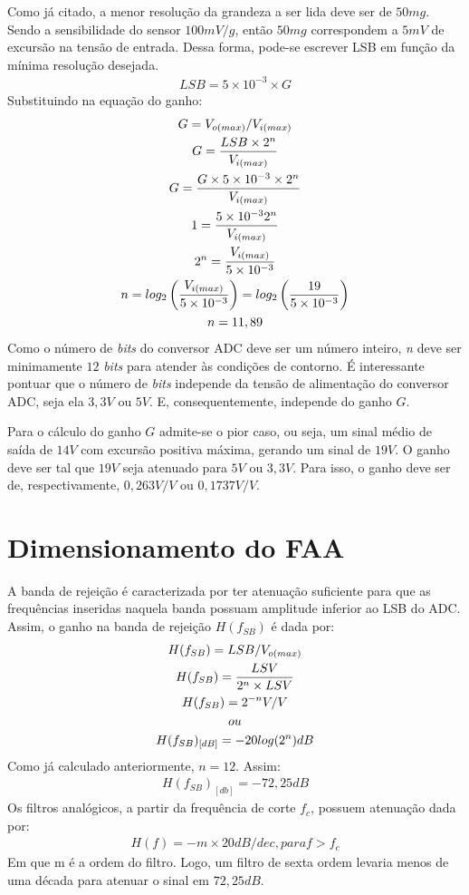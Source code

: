 \documentclass[
	12pt,				%
	openright,			%
	twoside,			%
	a4paper,			%
	english,			%
	french,				%
	spanish,			%
	brazil,				%
	]{abntex2}
\begin{document}
		Como já citado, a menor resolução da grandeza a ser lida deve ser de
		$50mg$. Sendo a sensibilidade do sensor $100mV/g$, então $50mg$
		correspondem a $5mV$ de excursão na tensão de entrada. Dessa forma,
		pode-se escrever LSB em função da mínima resolução desejada.
		\begin{gather*}
			LSB = 5\times 10^{-3}\times G
		\end{gather*}
		Substituindo na equação do ganho:
		\begin{gather*}
			G = V_{o(max)}/V_{i(max)}\\
			G = \frac{LSB\times 2^n}{V_{i(max)}}\\
			G = \frac{G\times 5\times 10^{-3}\times 2^n}{V_{i(max)}}\\
			1 = \frac{5\times 10^{-3}\*2^n}{V_{i(max)}}\\
			2^n = \frac{V_{i(max)}}{5\times 10^{-3}}\\
			n = log_2\left( \frac{V_{i(max)}}{5\times 10^{-3}} \right) = log_2\left( \frac{19}{5\times 10^{-3}}\right)\\
			n = 11,89
		\end{gather*}
		Como o número de \textit{bits} do conversor ADC deve ser um número inteiro, \textit{n}
		deve ser minimamente $12$ \textit{bits} para atender às condições de contorno. É
		interessante pontuar que o número de \textit{bits} independe da tensão de
		alimentação do conversor ADC, seja ela $3,3V$ ou $5V$. E, consequentemente,
		independe do ganho $G$.
		
		Para o cálculo do ganho $G$ admite-se o pior caso, ou seja, um sinal médio
		de saída de $14V$ com excursão positiva máxima, gerando um sinal de $19V$. O
		ganho deve ser tal que $19V$ seja atenuado para $5V$ ou $3,3V$. Para isso, o
		ganho deve ser de, respectivamente, $0,263V/V$ ou $0,1737V/V$.

	\section{Dimensionamento do FAA}

		A banda de rejeição é caracterizada por ter atenuação
		suficiente para que as frequências inseridas naquela banda possuam amplitude
		inferior ao LSB do ADC. Assim, o ganho na banda de rejeição $H(f_{SB})$ é
		dada por:
		\begin{gather*}
			H(f_{SB}) = LSB/V_{o(max)}\\
			H(f_{SB}) = \frac{LSV}{2^n\times LSV}\\
			H(f_{SB}) = 2^{-n}V/V\\
			ou\\
			H(f_{SB})_{[dB]} = -20\*log(2^n) dB
		\end{gather*}
		Como já calculado anteriormente, $n=12$. Assim:
		\begin{gather*}
			H(f_{SB})_{[db]} = -72,25 dB
		\end{gather*}
		Os filtros analógicos, a partir da frequência de corte $f_c$, possuem
		atenuação dada por:
		\begin{gather*}
			H(f) = -m\times 20 dB/dec, para f>f_c
		\end{gather*}
		Em que m é a ordem do filtro. Logo, um filtro de sexta ordem levaria
		menos de uma década para atenuar o sinal em $72,25dB$.
\end{document}
